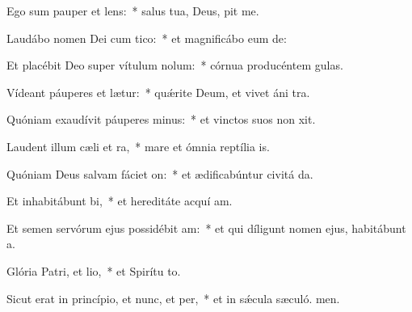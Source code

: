 \item Ego sum pauper et lens:~* salus tua, Deus, pit me.
\item Laudábo nomen Dei cum tico:~* et magnificábo eum  de:
\item Et placébit Deo super vítulum nolum:~* córnua producéntem  gulas.
\item Vídeant páuperes et lætur:~* quǽrite Deum, et vivet áni tra.
\item Quóniam exaudívit páuperes minus:~* et vinctos suos non xit.
\item Laudent illum cæli et ra,~* mare et ómnia reptília  is.
\item Quóniam Deus salvam fáciet on:~* et ædificabúntur civitá da.
\item Et inhabitábunt bi,~* et hereditáte acquí am.
\item Et semen servórum ejus possidébit am:~* et qui díligunt nomen ejus, habitábunt  a.
\item Glória Patri, et lio,~* et Spirítu to.
\item Sicut erat in princípio, et nunc, et per,~* et in sǽcula sæculó. men.
